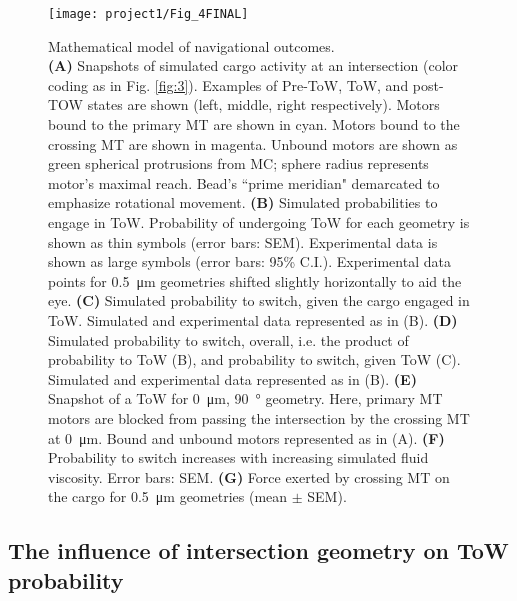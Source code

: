 \begin{figure}
\centering
\texttt{[image: project1/Fig\_4FINAL]}
\caption[Mathematical model of navigational outcomes]{Mathematical model of navigational outcomes. \\
\textbf{(A)} Snapshots of simulated cargo activity at an intersection (color coding as in Fig. \ref{fig:3}).
Examples of Pre-ToW, ToW, and post-TOW states are shown (left, middle, right respectively). Motors bound to the primary MT are shown in cyan. Motors bound to the crossing MT are shown in magenta. Unbound motors are shown as green spherical protrusions from MC; sphere radius represents motor's maximal reach. Bead's ``prime meridian" demarcated to emphasize rotational movement.
\textbf{(B)} Simulated probabilities to engage in ToW. Probability of undergoing ToW for each geometry is shown as thin symbols (error bars: SEM). Experimental data is shown as large symbols (error bars: 95\% C.I.). Experimental data points for \SI{.5}{\micro\meter} geometries shifted slightly horizontally to aid the eye.
\textbf{(C)} Simulated probability to switch, given the cargo engaged in ToW. Simulated and experimental data represented as in (B).
\textbf{(D)} Simulated probability to switch, overall, i.e. the product of probability to ToW (B), and probability to switch, given ToW (C). Simulated and experimental data represented as in (B).
\textbf{(E)} Snapshot of a ToW for \SI{0}{\micro\meter}, \SI{90}{\degree} geometry. Here, primary MT motors are blocked from passing the intersection by the crossing MT at \SI{0}{\micro\meter}. Bound and unbound motors represented as in (A).
\textbf{(F)} Probability to switch increases with increasing simulated fluid viscosity. Error bars: SEM.
\textbf{(G)} Force exerted by crossing MT on the cargo for \SI{.5}{\micro\meter} geometries (mean $\pm$ SEM).}
\label{fig:4}
\end{figure}

\subsection{The influence of intersection geometry on ToW probability}

